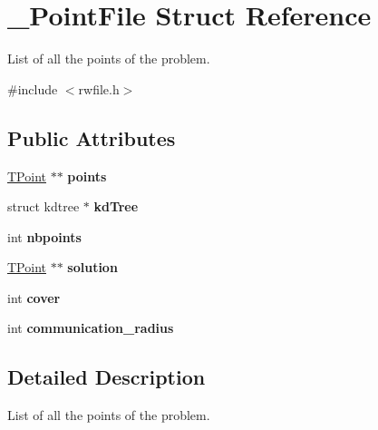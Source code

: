 \hypertarget{struct__PointFile}{}\section{\+\_\+\+Point\+File Struct Reference}
\label{struct__PointFile}


List of all the points of the problem.  




{\ttfamily \#include $<$rwfile.\+h$>$}

\subsection*{Public Attributes}
\begin{DoxyCompactItemize}
\item 
\mbox{\label{struct__PointFile_a55fc9bdc0b136300419e14deea8f0073}} 
\hyperlink{struct__TPoint}{T\+Point} $\ast$$\ast$ {\bfseries points}
\item 
\mbox{\label{struct__PointFile_adc623f25cbef77d397dbf3d4838aed67}} 
struct kdtree $\ast$ {\bfseries kd\+Tree}
\item 
\mbox{\label{struct__PointFile_a271dae65a4adaca4ed77d5d31dece69d}} 
int {\bfseries nbpoints}
\item 
\mbox{\label{struct__PointFile_abe941cb2fb263453c49a3ed4cb40edcf}} 
\hyperlink{struct__TPoint}{T\+Point} $\ast$$\ast$ {\bfseries solution}
\item 
\mbox{\label{struct__PointFile_aecf866d37a850eadcc17e0b870c71576}} 
int {\bfseries cover}
\item 
\mbox{\label{struct__PointFile_a3d6252424d786aae317cbb509a76cc5f}} 
int {\bfseries communication\+\_\+radius}
\end{DoxyCompactItemize}


\subsection{Detailed Description}
List of all the points of the problem. 

